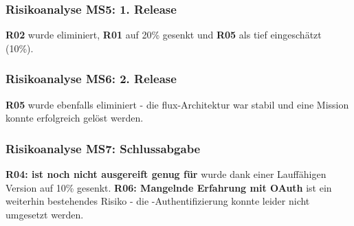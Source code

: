 \subsubsection{Risikoanalyse MS5: 1. Release}
\textbf{R02} wurde eliminiert, \textbf{R01} auf 20\% gesenkt und \textbf{R05} als tief eingeschätzt (10\%).

\subsubsection{Risikoanalyse MS6: 2. Release}
\textbf{R05} wurde ebenfalls eliminiert - die flux-Architektur war stabil und eine Mission konnte erfolgreich gelöst werden.

\subsubsection{Risikoanalyse MS7: Schlussabgabe}
\textbf{R04:  ist noch nicht ausgereift genug für } wurde dank einer Lauffähigen Version auf 10\% gesenkt.
\textbf{R06: Mangelnde Erfahrung mit OAuth} ist ein weiterhin bestehendes Risiko - die -Authentifizierung konnte leider nicht umgesetzt werden.